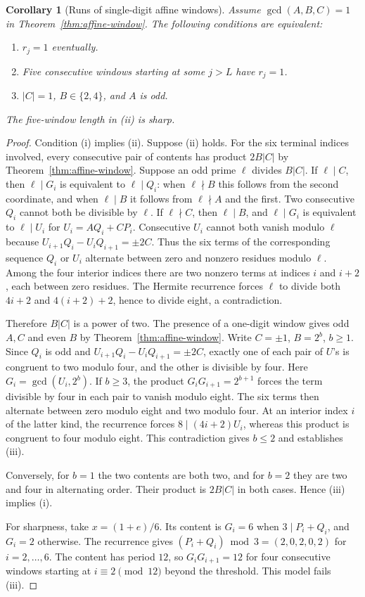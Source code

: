 \documentclass[11pt]{amsart}
\newtheorem{corollary}[theorem]{Corollary}
\theoremstyle{definition}
\theoremstyle{remark}
\numberwithin{equation}{section}
\begin{document}
\begin{corollary}[Runs of single-digit affine windows]\label{cor:affine-single}
Assume $\gcd(A,B,C)=1$ in Theorem~\ref{thm:affine-window}.
The following conditions are equivalent:
\begin{enumerate}
\item[(i)] $r_j=1$ eventually.
\item[(ii)] Five consecutive windows starting at some $j>L$ have $r_j=1$.
\item[(iii)] $|C|=1$, $B\in\{2,4\}$, and $A$ is odd.
\end{enumerate}
The five-window length in (ii) is sharp.
\end{corollary}
\begin{proof}
Condition (i) implies (ii). Suppose (ii) holds. For the six
terminal indices involved, every consecutive pair of contents
has product $2B|C|$ by Theorem~\ref{thm:affine-window}.
Suppose an odd prime $\ell$ divides $B|C|$. If $\ell\mid C$,
then $\ell\mid G_i$ is equivalent to $\ell\mid Q_i$:
when $\ell\nmid B$ this follows from the second coordinate, and
when $\ell\mid B$ it follows from $\ell\nmid A$ and the first.
Two consecutive $Q_i$ cannot both be divisible by $\ell$.
If $\ell\nmid C$, then $\ell\mid B$, and
$\ell\mid G_i$ is equivalent to $\ell\mid U_i$ for
$U_i=AQ_i+CP_i$. Consecutive $U_i$ cannot both vanish modulo $\ell$
because $U_{i+1}Q_i-U_iQ_{i+1}=\pm2C$.
Thus the six terms of the corresponding sequence $Q_i$ or $U_i$
alternate between zero and nonzero residues modulo $\ell$.
Among the four interior indices there are two nonzero terms
at indices $i$ and $i+2$, each between zero residues.
The Hermite recurrence forces $\ell$ to divide both $4i+2$
and $4(i+2)+2$, hence to divide eight, a contradiction.

Therefore $B|C|$ is a power of two. The presence of a one-digit
window gives odd $A,C$ and even $B$ by
Theorem~\ref{thm:affine-window}. Write $C=\pm1$, $B=2^b$, $b\ge1$.
Since $Q_i$ is odd and $U_{i+1}Q_i-U_iQ_{i+1}=\pm2C$, exactly one
of each pair of $U$'s is congruent to two modulo four, and the other
is divisible by four. Here $G_i=\gcd(U_i,2^b)$.
If $b\ge3$, the product $G_iG_{i+1}=2^{b+1}$ forces the term
divisible by four in each pair to vanish modulo eight.
The six terms then alternate between zero modulo eight and
two modulo four. At an interior index $i$ of the latter kind,
the recurrence forces $8\mid(4i+2)U_i$, whereas this product
is congruent to four modulo eight. This contradiction gives $b\le2$
and establishes (iii).

Conversely, for $b=1$ the two contents are both two, and for $b=2$
they are two and four in alternating order. Their product is
$2B|C|$ in both cases. Hence (iii) implies (i).

For sharpness, take $x=(1+e)/6$. Its content is $G_i=6$ when
$3\mid P_i+Q_i$, and $G_i=2$ otherwise. The recurrence gives
$(P_i+Q_i)\bmod3=(2,0,2,0,2)$ for $i=2,\ldots,6$.
The content has period $12$, so $G_iG_{i+1}=12$ for four
consecutive windows starting at $i\equiv2\pmod{12}$ beyond the
threshold. This model fails (iii).
\end{proof}
\end{document}
